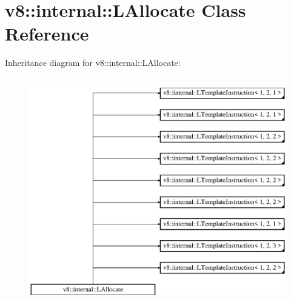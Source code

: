 \hypertarget{classv8_1_1internal_1_1_l_allocate}{}\section{v8\+:\+:internal\+:\+:L\+Allocate Class Reference}
\label{classv8_1_1internal_1_1_l_allocate}
Inheritance diagram for v8\+:\+:internal\+:\+:L\+Allocate\+:\begin{figure}[H]
\begin{center}
\leavevmode
\includegraphics[height=10.000000cm]{classv8_1_1internal_1_1_l_allocate}
\end{center}
\end{figure}
